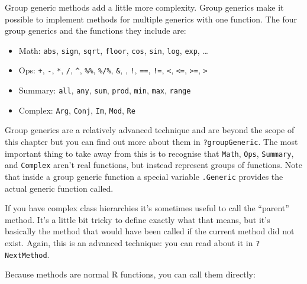 Group generic methods add a little more complexity. Group generics make
it possible to implement methods for multiple generics with one
function. The four group generics and the functions they include are:
 

\begin{itemize}
\tightlist
\item
  Math: \texttt{abs}, \texttt{sign}, \texttt{sqrt}, \texttt{floor},
  \texttt{cos}, \texttt{sin}, \texttt{log}, \texttt{exp}, \ldots{}
\item
  Ops: \texttt{+}, \texttt{-}, \texttt{*}, \texttt{/}, \texttt{\^{}},
  \texttt{\%\%}, \texttt{\%/\%}, \texttt{\&}, \texttt{\textbar{}},
  \texttt{!}, \texttt{==}, \texttt{!=}, \texttt{\textless{}},
  \texttt{\textless{}=}, \texttt{\textgreater{}=},
  \texttt{\textgreater{}}
\item
  Summary: \texttt{all}, \texttt{any}, \texttt{sum}, \texttt{prod},
  \texttt{min}, \texttt{max}, \texttt{range}
\item
  Complex: \texttt{Arg}, \texttt{Conj}, \texttt{Im}, \texttt{Mod},
  \texttt{Re}
\end{itemize}

Group generics are a relatively advanced technique and are beyond the
scope of this chapter but you can find out more about them in
\texttt{?groupGeneric}. The most important thing to take away from this
is to recognise that \texttt{Math}, \texttt{Ops}, \texttt{Summary}, and
\texttt{Complex} aren't real functions, but instead represent groups of
functions. Note that inside a group generic function a special variable
\texttt{.Generic} provides the actual generic function called.

If you have complex class hierarchies it's sometimes useful to call the
``parent'' method. It's a little bit tricky to define exactly what that
means, but it's basically the method that would have been called if the
current method did not exist. Again, this is an advanced technique: you
can read about it in \texttt{?NextMethod}. 

Because methods are normal R functions, you can call them directly:

\begin{Shaded}
\begin{Highlighting}[]
\StringTok{ }\NormalTok{(}\NormalTok{(), } \NormalTok{)}
\end{Highlighting}
\end{Shaded}


